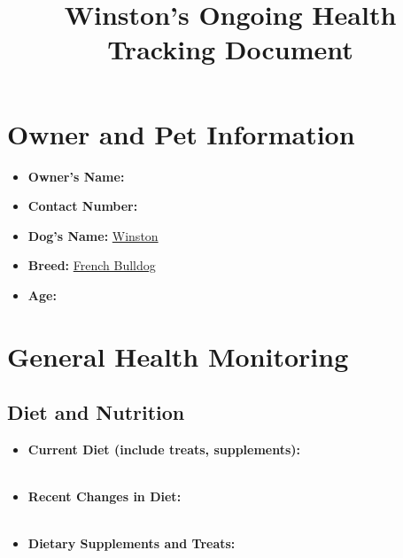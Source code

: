 \documentclass{article}
\title{Winston's Ongoing Health Tracking Document}
\date{}
\begin{document}
\maketitle

\section*{Owner and Pet Information}
\begin{itemize}
    \item \textbf{Owner's Name:} \underline{\hspace{6cm}}
    \item \textbf{Contact Number:} \underline{\hspace{6cm}}
    \item \textbf{Dog's Name:} \underline{Winston\hspace{4.5cm}}
    \item \textbf{Breed:} \underline{French Bulldog\hspace{3.85cm}}
    \item \textbf{Age:} \underline{\hspace{5.8cm}}
\end{itemize}

\section*{General Health Monitoring}
\subsection*{Diet and Nutrition}
\begin{itemize}
    \item \textbf{Current Diet (include treats, supplements):} \\
    \underline{\hspace{\textwidth}} \\
    \underline{\hspace{\textwidth}}
    \item \textbf{Recent Changes in Diet:} \\
    \underline{\hspace{\textwidth}} \\
    \underline{\hspace{\textwidth}}
    \item \textbf{Dietary Supplements and Treats:} \\
    \underline{\hspace{\textwidth}} \\
    \underline{\hspace{\textwidth}}
\end{itemize}
\end{document}
